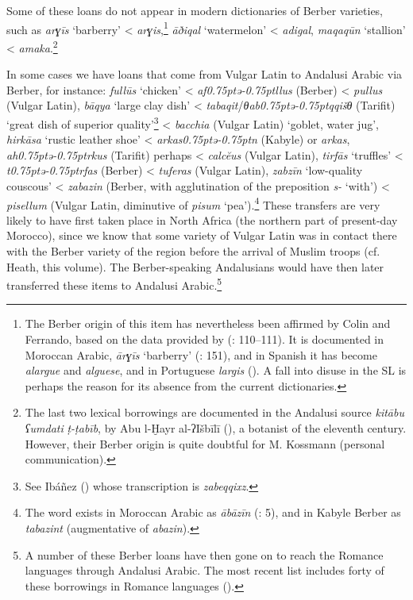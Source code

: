 \documentclass[output=paper,modfonts,nonflat]{langsci/langscibook}
\begin{document}
Some of these loans do not appear in modern dictionaries of Berber varieties, such as \textit{arɣīs} ‘barberry’ < \textit{arɣis},\footnote{The Berber origin of this item has nevertheless been affirmed by Colin and Ferrando, based on the data provided by  (\citealt{Ferrando1997}: 110–111). It is documented in Moroccan Arabic, \textit{ārɣīs} ‘barberry’ (\citealt{Prémare1995}: 151), and in Spanish it has become \textit{alargue} and \textit{alguese}, and in Portuguese \textit{largis} (\citealt{CorrientePereiraVicenteforthcoming}). A fall into disuse in the SL is perhaps the reason for its absence from the current dictionaries.} \textit{āðiqal} ‘watermelon’ < \textit{adigal}, \textit{maqaqūn} ‘stallion’ < \textit{amaka}.\footnote{The last two lexical borrowings are documented in the Andalusi source \textit{kitābu} \textit{ʕumdati} \textit{ṭ-ṭabīb}, by Abu l-Ḫayr al-ʔIšbīlī (\citeyear{Abūl-Ḫayral-Išbīlī2004,Abūl-Ḫayral-Išbīlī2007}), a botanist of the eleventh century. However, their Berber origin is quite doubtful for M. Kossmann (personal communication).} 

In some cases we have loans that come from Vulgar Latin to Andalusi Arabic via Berber, for instance: \textit{fullūs} ‘chicken’ < \textit{af\kern 0.75ptǝ\kern -0.75ptllus} (Berber) < \textit{pullus} (Vulgar Latin), \textit{bāqya} ‘large clay dish’ < \textit{tabaqit}/\textit{θab\kern 0.75ptǝ\kern -0.75ptqqišθ} (Tarifit) ‘great dish of superior quality’\footnote{See Ibáñez (\citeyear[272]{Ibáñez1949}) whose transcription is \textit{zabeqqixz}.} < \textit{bacchia} (Vulgar Latin) ‘goblet, water jug’, \textit{hirkāsa} ‘rustic leather shoe’ < \textit{arkas\kern 0.75ptǝ\kern -0.75ptn} (Kabyle) or \textit{arkas}, \textit{ah\kern 0.75ptǝ\kern -0.75ptrkus} (Tarifit) perhaps < \textit{calcĕus} (Vulgar Latin), \textit{tirfās} ‘truffles’ < \textit{t\kern 0.75ptǝ\kern -0.75ptrfas} (Berber) < \textit{tuferas} (Vulgar Latin), \textit{zabzīn} ‘low-quality couscous’ < \textit{zabazin} (Berber, {with  agglutination of the preposition} \textit{s-} ‘with’) < \textit{pisellum} (Vulgar Latin, diminutive of \textit{pisum} ‘pea’).\footnote{The word exists in Moroccan Arabic as \textit{ābāzīn} (\citealt{Prémare1993}: 5), and in Kabyle Berber as \textit{tabazint} (augmentative of \textit{abazin}).}  These transfers are very likely to have first taken place in North Africa (the northern part of present-day Morocco), since we know that some variety of Vulgar Latin was in contact there with the Berber variety of the region before the arrival of Muslim troops (cf. Heath, this volume). The Berber-speaking Andalusians would have then later transferred these items to Andalusi Arabic.\footnote{A number of these Berber loans have then gone on to reach the Romance languages through Andalusi Arabic. The most recent list includes forty of these borrowings in Romance languages (\citealt{CorrientePereiraVicente2019}).}  
\end{document}
